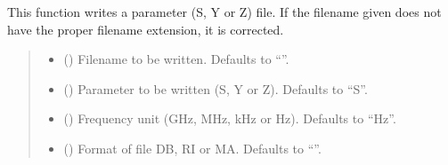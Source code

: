 \documentclass[letterpaper,10pt,english]{sphinxmanual}
\begin{document}
\begin{fulllineitems}
\begin{fulllineitems}
\label{\detokenize{touchstone:touchstone.spfile.write2file}}
\pysigstartsignatures
{}
\pysigstopsignatures
\sphinxAtStartPar
This function writes a parameter (S, Y or Z) file. If the filename given does not have the proper filename extension, it is corrected.
\begin{quote}\begin{description}
\begin{itemize}
\item {} 
\sphinxAtStartPar
{} (\sphinxstyleliteralemphasis{\sphinxupquote{, }}) \textendash{} Filename to be written. Defaults to “”.

\item {} 
\sphinxAtStartPar
{} (\sphinxstyleliteralemphasis{\sphinxupquote{, }}) \textendash{} Parameter to be written (S, Y or Z). Defaults to “S”.

\item {} 
\sphinxAtStartPar
{} (\sphinxstyleliteralemphasis{\sphinxupquote{, }}) \textendash{} Frequency unit (GHz, MHz, kHz or Hz). Defaults to “Hz”.

\item {} 
\sphinxAtStartPar
{} (\sphinxstyleliteralemphasis{\sphinxupquote{, }}) \textendash{} Format of file DB, RI or MA. Defaults to “”.

\end{itemize}

\end{description}\end{quote}

\end{fulllineitems}


\end{fulllineitems}
\end{document}
